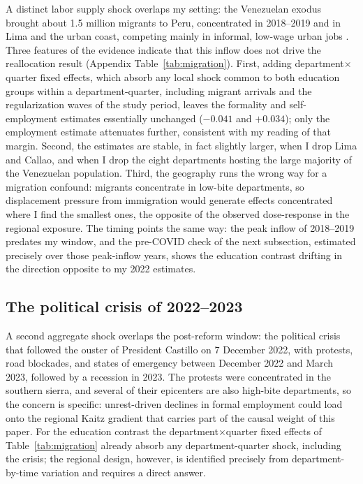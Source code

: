 A distinct labor supply shock overlaps my setting: the Venezuelan exodus brought
about 1.5 million migrants to Peru, concentrated in 2018--2019 and in Lima and the
urban coast, competing mainly in informal, low-wage urban jobs
\citep{asencios_castellares_2020}. Three features of the evidence indicate that
this inflow does not drive the reallocation result (Appendix
Table~\ref{tab:migration}). First, adding department$\times$quarter fixed effects,
which absorb any local shock common to both education groups within a
department-quarter, including migrant arrivals and the regularization waves of the
study period, leaves the formality and self-employment estimates essentially
unchanged ($-0.041$ and $+0.034$); only the employment estimate attenuates further,
consistent with my reading of that margin. Second, the estimates are stable, in
fact slightly larger, when I drop Lima and Callao, and when I drop the eight
departments hosting the large majority of the Venezuelan population. Third, the
geography runs the wrong way for a migration confound: migrants concentrate in
low-bite departments, so displacement pressure from immigration would generate
effects concentrated where I find the smallest ones, the opposite of the observed
dose-response in the regional exposure. The timing points the same way: the peak
inflow of 2018--2019 predates my window, and the pre-COVID check of the next
subsection, estimated precisely over those peak-inflow years, shows the education
contrast drifting in the direction opposite to my 2022 estimates.

\subsection{The political crisis of 2022--2023}

A second aggregate shock overlaps the post-reform window: the political crisis that
followed the ouster of President Castillo on 7 December 2022, with protests, road
blockades, and states of emergency between December 2022 and March 2023, followed by
a recession in 2023. The protests were concentrated in the southern sierra, and
several of their epicenters are also high-bite departments, so the concern is
specific: unrest-driven declines in formal employment could load onto the regional
Kaitz gradient that carries part of the causal weight of this paper. For the
education contrast the department$\times$quarter fixed effects of
Table~\ref{tab:migration} already absorb any department-quarter shock, including the
crisis; the regional design, however, is identified precisely from
department-by-time variation and requires a direct answer.

